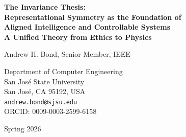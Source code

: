 \documentclass[12pt]{article}
\begin{document}
\begin{titlepage}
\centering
\vspace*{2cm}

{\LARGE\bfseries The Invariance Thesis:\\Representational Symmetry as the Foundation of\\Aligned Intelligence and Controllable Systems\\[0.5em]
\large A Unified Theory from Ethics to Physics}

\vspace{1.5cm}

{\Large Andrew H. Bond, Senior Member, IEEE}

\vspace{0.5cm}

{\large
Department of Computer Engineering\\
San Jos\'e State University\\
San Jos\'e, CA 95192, USA\\[0.3cm]
\texttt{andrew.bond@sjsu.edu}\\[0.3cm]
ORCID: 0009-0003-2599-6158
}

\vspace{1cm}

{\large Spring 2026}

\vspace{2cm}

\begin{abstract}
We present the \textbf{Invariance Thesis}: the claim that a single mathematical principle---representational symmetry under structure-preserving transformations---underlies and unifies (1) the formal foundations of ethical reasoning, (2) the containment of superintelligent AI, (3) the gauge-theoretic structure of decision systems, and (4) the control of physical systems with hard constraints. We identify three deep principles that emerge from this unification: the \textit{Grounding Principle} (evaluation must depend on physical observables, not descriptions), the \textit{Canonicalization Principle} (equivalent representations must be identified before evaluation), and the \textit{Conservation Principle} (representational symmetry implies conserved quantities via Noether's theorem). We show that these principles constitute a ``meta-theory'' that transcends the distinction between ethical and physical systems, revealing alignment, safety, and control as manifestations of a single geometric structure.
\end{abstract}

\vfill


\end{titlepage}
\end{document}
